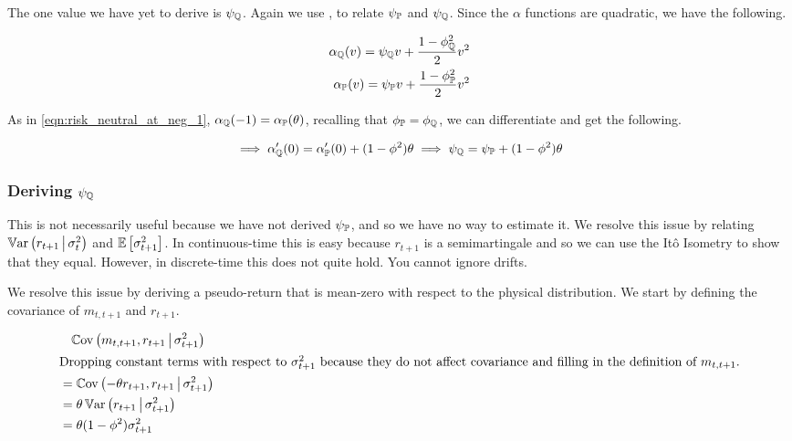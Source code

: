 \documentclass[11pt, letterpaper, twoside, final]{article}
\begin{document}
The one value we have yet to derive is $\psi_{\mathbb{Q}}$.
Again we use \textcite[Proposition 5]{khrapov2016affine}, to relate $\psi_{\mathbb{P}}$ and $\psi_{\mathbb{Q}}$. 
Since the $\alpha$ functions are quadratic, we have the following.

\begin{align}
    \alpha_{\QQ}(v) = \psi_{\QQ} v + \frac{1- \phi^2_{\QQ}}{2} v^2  \\
%
    \alpha_{\PP}(v) = \psi_{\PP} v + \frac{1- \phi^2_{\PP}}{2} v^2  
\end{align}

As in \cref{eqn:risk_neutral_at_neg_1}, $\alpha_{\mathbb{Q}}(-1) = \alpha_{\mathbb{P}}(\theta)$, recalling that $\phi_{\mathbb{P}} =
\phi_{\mathbb{Q}}$, we can differentiate and get the following.

\begin{align}
    \implies \alpha_{\QQ}'(0) = \alpha_{\PP}'(0) + (1 - \phi^2) \theta
%
    \implies \psi_{\QQ} = \psi_{\PP} + (1 - \phi^2) \theta
\end{align}


\subsubsection{Deriving \texorpdfstring{$\psi_{\mathbb{Q}}$}{\psi}}

This is not necessarily useful because we have not derived $\psi_{\mathbb{P}}$, and so we have no way to estimate it.
We resolve this issue by relating $\operatorname{\mathbb{V}ar}\left(r_{t+1} \,\middle\vert\, \sigma^2_t\right)$ and $\operatorname{\mathbb{E}}\left[\sigma^2_{t+1}\right]$.
In continuous-time this is easy because $r_{t+1}$ is a semimartingale and so we can use the It\^{o} Isometry to
show that they equal. 
However, in discrete-time this does not quite hold.
You cannot ignore drifts.

We resolve this issue by deriving a pseudo-return that is mean-zero with respect to the physical distribution. 
We start by defining the covariance of $m_{t,t+1}$ and $r_{t+1}$.

\begin{align}
    &\phantom{=} \Cov\left(m_{t,t+1}, r_{t+1} \mvert \sigma^2_{t+1}\right)   \\
%
    \intertext{Dropping constant terms with respect to $\sigma^2_{t+1}$ because they do not affect covariance and
    filling in the definition of $m_{t, t+1}$.}
    &= \Cov\left(-\theta r_{t+1}, r_{t+1} \mvert \sigma^2_{t+1}\right)   \\
%
    &= \theta \Var\left(r_{t+1} \mvert \sigma^2_{t+1}\right)   \\
%
    &= \theta (1 - \phi^2) \sigma^2_{t+1} 
\end{align}
\end{document}
